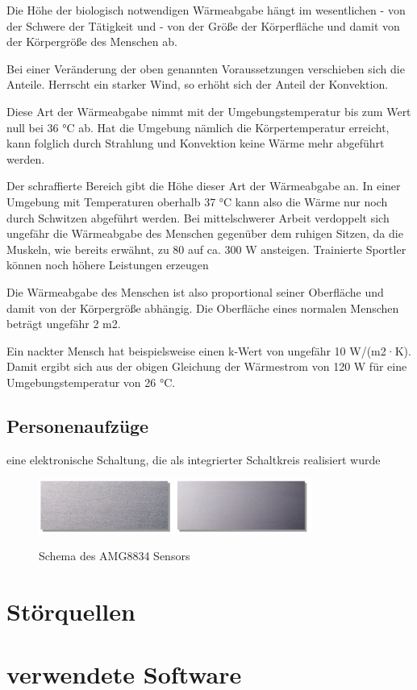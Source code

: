 Die Höhe der biologisch notwendigen Wärmeabgabe hängt im wesentlichen
- von der Schwere der Tätigkeit und
- von der Größe der Körperfläche und damit von der Körpergröße des Menschen ab.


Bei einer Veränderung der oben genannten Voraussetzungen verschieben sich die Anteile.
Herrscht ein starker Wind, so erhöht sich der Anteil der Konvektion.

Diese Art der Wärmeabgabe nimmt mit der Umgebungstemperatur bis zum Wert null bei 36 °C ab. Hat die Umgebung nämlich die
Körpertemperatur erreicht, kann folglich durch Strahlung und Konvektion keine Wärme mehr
abgeführt werden.

Der schraffierte Bereich gibt die Höhe dieser Art der
Wärmeabgabe an. In einer Umgebung mit Temperaturen oberhalb 37 °C kann also die Wärme
nur noch durch Schwitzen abgeführt werden. Bei mittelschwerer Arbeit verdoppelt sich
ungefähr die Wärmeabgabe des Menschen gegenüber dem ruhigen Sitzen, da die Muskeln,
wie bereits erwähnt, zu 80 %
auf ca. 300 W ansteigen. Trainierte Sportler können noch höhere Leistungen erzeugen

Die
Wärmeabgabe des Menschen ist also proportional seiner Oberfläche und damit von der Körpergröße abhängig. Die Oberfläche eines normalen Menschen beträgt ungefähr 2 m2.

Ein nackter Mensch hat beispielsweise einen k-Wert von
ungefähr 10 W/(m2·K). Damit ergibt sich aus der obigen Gleichung der Wärmestrom von 120
W für eine Umgebungstemperatur von 26 °C. \cite{MenschWaerme}

\subsection{Personenaufzüge}

eine elektronische Schaltung, die als integrierter Schaltkreis realisiert wurde


\begin{figure}[H]
	\centering
	\includegraphics[width=0.8\textwidth]
	{fig/Edelstahl_gewalzt.PNG}
	\caption[Schema des AMG8834 Sensors]{Schema des AMG8834 Sensors} \protect\cite{Edelstahl}
	\label{fig:Edelstahl}
\end{figure}

\section{Störquellen}


\section{verwendete Software}